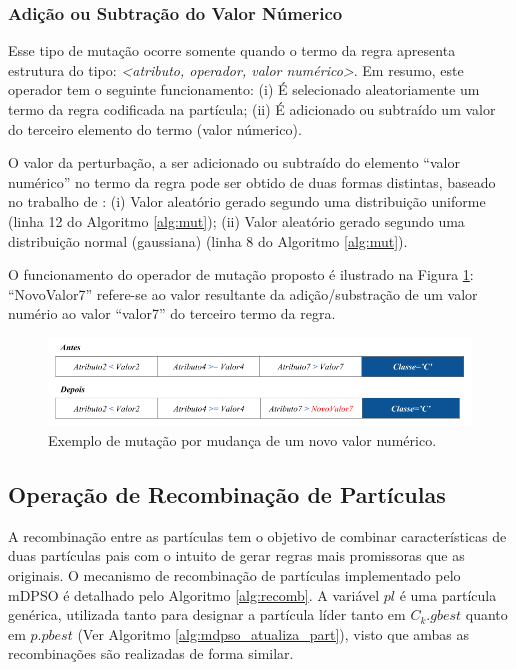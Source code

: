 \documentclass[
	12pt,				%
	openany,			%
	oneside,	
	a4paper,			%
	brazil,				%
	]{unimontes-ppgmsc-abntex2}
\begin{document}
\subsubsection{Adição ou Subtração do Valor Númerico}
\label{sec:mdpso_mut3} 

Esse tipo de mutação ocorre somente quando o termo da regra apresenta  estrutura do tipo: \textit{<atributo, operador, valor numérico>}. Em resumo, este operador tem o seguinte funcionamento: (i) É selecionado aleatoriamente um termo da regra codificada na partícula; (ii) É adicionado ou subtraído um valor do terceiro elemento do termo ({valor númerico}). 

O valor da perturbação, a ser adicionado ou subtraído do elemento ``valor numérico'' no termo da regra pode ser obtido de duas formas distintas, baseado no trabalho de : (i) Valor aleatório gerado segundo uma distribuição uniforme (linha 12 do Algoritmo \ref{alg:mut}); (ii) Valor aleatório gerado segundo uma distribuição normal (gaussiana) (linha 8 do Algoritmo \ref{alg:mut}).

O funcionamento do operador de mutação proposto é ilustrado na Figura \ref{fig:mut_3}: ``NovoValor7'' refere-se ao valor resultante da adição/substração de um valor numério ao valor ``valor7'' do terceiro termo da regra.

\begin{figure}[ht]
\centering
\includegraphics[scale=.5]{img/mut_3}
\caption{Exemplo de mutação por mudança de um novo valor numérico.}
\label{fig:mut_3}
\end{figure}


\subsection{Operação de Recombinação de Partículas}
\label{sec:mdpso_recomb_part}

A recombinação entre as partículas tem o objetivo de combinar características de duas partículas pais com o intuito de gerar regras mais promissoras que as originais. O mecanismo de recombinação de partículas implementado pelo mDPSO é detalhado pelo Algoritmo \ref{alg:recomb}. A variável $pl$ é uma partícula genérica, utilizada tanto para designar a partícula líder tanto em $C_k.gbest$ quanto em $p.pbest$ (Ver Algoritmo \ref{alg:mdpso_atualiza_part}), visto que ambas as recombinações são realizadas de forma similar. 
\end{document}
